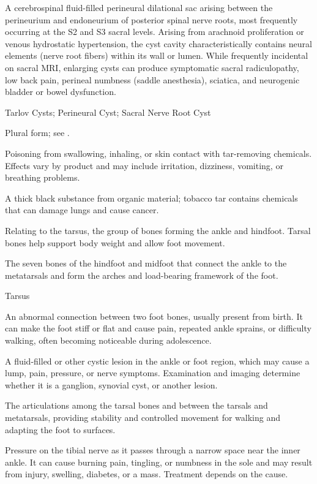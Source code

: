  A cerebrospinal fluid-filled perineural dilational sac arising between the perineurium and endoneurium of posterior spinal nerve roots, most frequently occurring at the S2 and S3 sacral levels. Arising from arachnoid proliferation or venous hydrostatic hypertension, the cyst cavity characteristically contains neural elements (nerve root fibers) within its wall or lumen. While frequently incidental on sacral MRI, enlarging cysts can produce symptomatic sacral radiculopathy, low back pain, perineal numbness (saddle anesthesia), sciatica, and neurogenic bladder or bowel dysfunction.

\synonyms
Tarlov Cysts; Perineural Cyst; Sacral Nerve Root Cyst

 Plural form; see .

 Poisoning from swallowing, inhaling, or skin contact with tar-removing chemicals. Effects vary by product and may include irritation, dizziness, vomiting, or breathing problems.

 A thick black substance from organic material; tobacco tar contains chemicals that can damage lungs and cause cancer.

 Relating to the tarsus, the group of bones forming the ankle and hindfoot. Tarsal bones help support body weight and allow foot movement.

 The seven bones of the hindfoot and midfoot that connect the ankle to the metatarsals and form the arches and load-bearing framework of the foot.

\synonyms
Tarsus

 An abnormal connection between two foot bones, usually present from birth. It can make the foot stiff or flat and cause pain, repeated ankle sprains, or difficulty walking, often becoming noticeable during adolescence.

 A fluid-filled or other cystic lesion in the ankle or foot region, which may cause a lump, pain, pressure, or nerve symptoms. Examination and imaging determine whether it is a ganglion, synovial cyst, or another lesion.

 The articulations among the tarsal bones and between the tarsals and metatarsals, providing stability and controlled movement for walking and adapting the foot to surfaces.

 Pressure on the tibial nerve as it passes through a narrow space near the inner ankle. It can cause burning pain, tingling, or numbness in the sole and may result from injury, swelling, diabetes, or a mass. Treatment depends on the cause.

